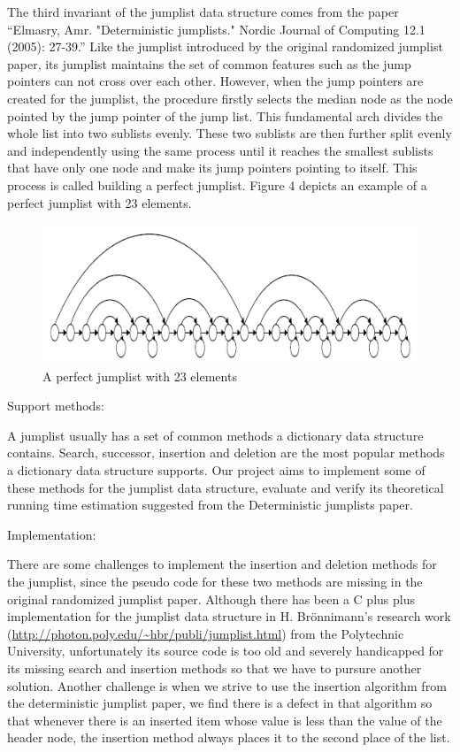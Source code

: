\documentclass[oribibl]{llncs}
\begin{document}
The third invariant of the jumplist data structure comes from the paper “Elmasry, Amr. "Deterministic jumplists." Nordic Journal of Computing 12.1 (2005): 27-39.” Like the jumplist introduced by the original randomized jumplist paper, its jumplist maintains the set of common features such as the jump pointers can not cross over  each other. However, when the jump pointers are created for the jumplist, the procedure firstly selects the median node as the node pointed by the jump pointer of the jump list. This fundamental arch divides the whole list into two sublists evenly. These two sublists are then further split evenly and independently using the same process until it reaches the smallest sublists that have only one node and make its jump pointers pointing to itself. This process is called building a perfect jumplist. Figure 4 depicts an example of a perfect jumplist with 23 elements.


\begin{figure}[here]
\center
\includegraphics[width=12cm]{images/perfect_jumplist}
\caption{A perfect jumplist with 23 elements}
\label{fig:jumplist}
\end{figure}


Support methods:

A jumplist usually has a set of common methods a dictionary data structure contains. Search, successor, insertion and deletion are the most popular methods a dictionary data structure supports. Our project aims to implement some of these methods for the jumplist data structure, evaluate and verify its theoretical running time estimation suggested from the Deterministic jumplists paper.

Implementation:

There are some challenges to implement the insertion and deletion methods for the jumplist, since the pseudo code for these two methods are missing in the original randomized jumplist paper. Although there has been a C plus plus implementation for the jumplist data structure in H. Brönnimann’s research work (\url{http://photon.poly.edu/~hbr/publi/jumplist.html}) from the Polytechnic University, unfortunately its source code is too old and severely handicapped for its missing search and insertion methods so that we have to pursure another solution. Another challenge is when we strive to use the insertion algorithm from the deterministic jumplist paper, we find there is a defect in that algorithm so that whenever there is an inserted item whose value is less than the value of the header node, the insertion method always places it to the second place of the list.
\end{document}
